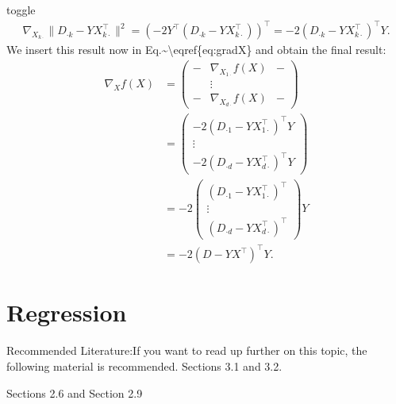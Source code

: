 \documentclass[letterpaper,10pt,english]{jupyterBook}
\begin{document}
\begin{enumerate}
\begin{sphinxuseclass}{toggle}
\begin{equation*}
\begin{split}\nabla_{X_{k\cdot}}\lVert D_{\cdot k}-YX_{k\cdot}^\top\rVert^2
=(-2Y^\top(D_{\cdot k}-YX_{k\cdot}^\top))^\top
= -2 (D_{\cdot k}-YX_{k\cdot}^\top)^\top Y.\end{split}
\end{equation*}
We insert this result now in Eq.\textasciitilde{}\textbackslash{}eqref\{eq:gradX\} and obtain the final result:
\begin{align*}
    \nabla_Xf(X) &= \begin{pmatrix}
- &\nabla_{X_{1\cdot }}f(X) &-\\&\vdots&\\-&\nabla_{X_{d\cdot }}f(X)&-\end{pmatrix}\\
&= \begin{pmatrix}
-2 (D_{\cdot 1}-YX_{1\cdot}^\top)^\top Y \\\vdots\\
-2 (D_{\cdot d}-YX_{d\cdot}^\top)^\top Y\end{pmatrix}\\
&=-2\begin{pmatrix}
 (D_{\cdot 1}-YX_{1\cdot}^\top)^\top  \\\vdots\\
 (D_{\cdot d}-YX_{d\cdot}^\top)^\top \end{pmatrix}Y\\
 &=-2 (D-YX^\top)^\top Y.
\end{align*}
\end{sphinxuseclass}
\end{enumerate}

\sphinxstepscope


\chapter{Regression}
\label{\detokenize{regression:regression}}\label{\detokenize{regression::doc}}
\sphinxAtStartPar
Recommended Literature:If you want to read up further on this topic, the following material is recommended.
Sections 3.1  and 3.2. 

\sphinxAtStartPar
{}
Sections 2.6  and Section 2.9 
\end{document}

